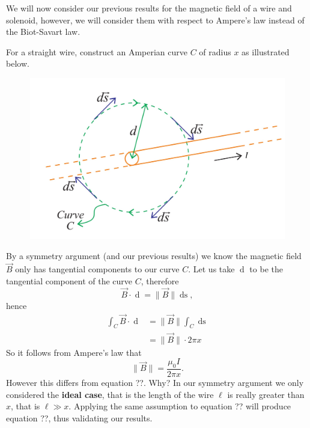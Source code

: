 We will now consider our previous results for the magnetic field of a wire and solenoid, however, we will consider them with respect to Ampere's law instead of the Biot-Savart law. 

For a straight wire, construct an Amperian curve $C$ of radius $x$ as illustrated below.

\begin{figure}[h!]
    \centering
    \includegraphics[scale=0.3]{notes/images/Ampere-Law-Straight-Wire.JPG}
\end{figure}
\FloatBarrier

By a symmetry argument (and our previous results) we know the magnetic field $\vec{B}$ only has tangential components to our curve $C$. Let us take $\mathop{\mathrm{d}\vec{s}}$ to be the tangential component of the curve $C$, therefore
\begin{equation}
    \vec{B} \cdot \mathop{\mathrm{d}\vec{s}} = \| \vec{B} \| \mathop{\mathrm{d}s},
\end{equation}
hence
\begin{align}
    \int_C \vec{B} \cdot \mathop{\mathrm{d}\vec{s}} &= \| \vec{B} \| \int_C \mathop{\mathrm{d}s} \\
    &= \| \vec{B} \| \cdot 2\pi x
\end{align}
So it follows from Ampere's law that
\begin{equation}
    \| \vec{B} \| = \frac{\mu_0 I}{2 \pi x}.
\end{equation}
However this differs from equation ??. Why? In our symmetry argument we only considered the \textbf{ideal case}, that is the length of the wire $\ell$ is really greater than $x$, that is $\ell \gg x$. Applying the same assumption to equation ?? will produce equation ??, thus validating our results. 

